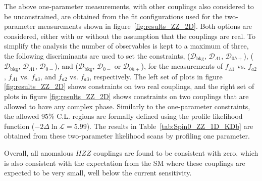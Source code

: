 The above one-parameter measurements, with other couplings also considered to be unconstrained, are obtained
from the fit configurations used for the two-parameter measurements shown in figure~\ref{fig:results_ZZ_2D}.
Both options are considered, either with or without the assumption that the couplings are real. To simplify the analysis
the number of observables is kept to a maximum of three, the following discriminants are
used to set the constraints,
($\mathcal{D}_\text{bkg}$, $\mathcal{D}_{\Lambda1}$, $\mathcal{D}_{0h+}$),
($\mathcal{D}_\text{bkg}$, $\mathcal{D}_{\Lambda1}$, $\mathcal{D}_{0-}$),
and ($\mathcal{D}_\text{bkg}$, $\mathcal{D}_{0-}$ or $\mathcal{D}_{0h+}$),
for the measurements of
$f_{\Lambda1}$ vs. $f_{a2}$, $f_{\Lambda1}$ vs. $f_{a3}$, and $f_{a2}$ vs. $f_{a3}$, respectively.
The left set of plots in figure \ref{fig:results_ZZ_2D} shows constraints on two real couplings, and
the right set of plots in figure \ref{fig:results_ZZ_2D} shows constraints on two couplings that are
allowed to have any complex phase. Similarly to the one-parameter constraints,
the allowed 95\% C.L. regions are formally defined using the profile likelihood function ($-2\Delta \ln\mathcal{L} = 5.99$).
The results in Table~\ref{tab:Spin0_ZZ_1D_KDb} are obtained from these two-parameter likelihood scans by profiling one parameter.

Overall, all anomalous $HZZ$ couplings are found to be consistent with zero, which is also consistent with the expectation
from the SM where these couplings are expected to be very small, well below the current sensitivity.

